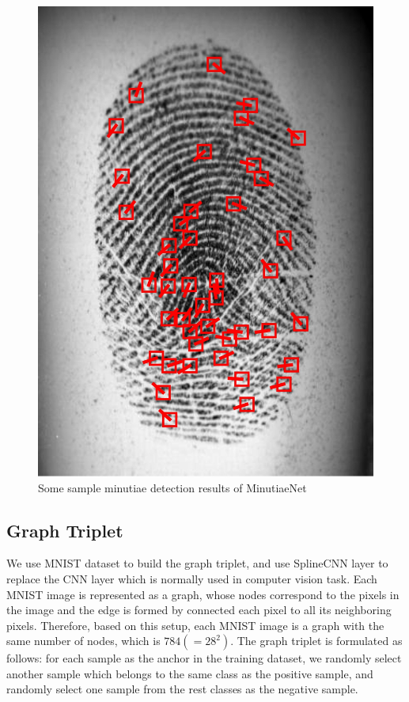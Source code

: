 \begin{figure}[htbp]
    \includegraphics[width=\figwidth\linewidth]{fig/minutiaenet/5.jpg}
    \caption{Some sample minutiae detection results of MinutiaeNet \cite{NguyenICB2018}}
    \label{fig:minutiaenet-results}
\end{figure}





\subsection{Graph Triplet}

We use MNIST dataset \cite{LecunIEEE1998} to build the graph triplet, and use SplineCNN layer \cite{FeyCVPR2018splinecnn} \cite{FeyICLR2020DGMC} to replace the CNN layer which is normally used in computer vision task. Each MNIST image is represented as a graph, whose nodes correspond to the pixels in the image and the edge is formed by connected each pixel to all its neighboring pixels. Therefore, based on this setup, each MNIST image is a graph with the same number of nodes, which is $784(=28^2)$. The graph triplet is formulated as follows: for each sample as the anchor in the training dataset, we randomly select another sample which belongs to the same class as the positive sample, and randomly select one sample from the rest classes as the negative sample. 

